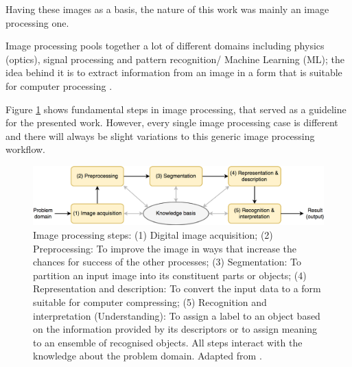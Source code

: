 Having these images as a basis, the nature of this work was mainly an image processing one.

Image processing pools together a lot of different domains including physics (optics), signal processing and pattern recognition/ Machine Learning (ML); %
the idea behind it is to extract information from an image in a form that is suitable for computer processing \cite{pydata2018}. 

Figure \ref{fig:imageprocessingWorkflow} shows fundamental steps in image processing, that served as a guideline for the presented work. However, every single image processing case is different and there will always be slight variations to this generic image processing workflow.




\begin{figure}[H]
	\centering
	\includegraphics[width=\textwidth]{../Figures/imageprocessing.png}
	\caption{Image processing steps: (1) Digital image acquisition; (2) Preprocessing: To improve the image in ways that increase the chances for success of the other processes; (3) Segmentation: To partition an input image into its constituent parts or objects; (4) Representation and description: To convert the input data to a form suitable for computer compressing; %
	(5) Recognition and interpretation (Understanding): To assign a label to an object based on the information provided by its descriptors or to assign meaning to an ensemble of recognised objects. All steps interact with the knowledge about the problem domain. 
		Adapted from \cite{imagProcFundamentals}.}
	\label{fig:imageprocessingWorkflow}
\end{figure}



